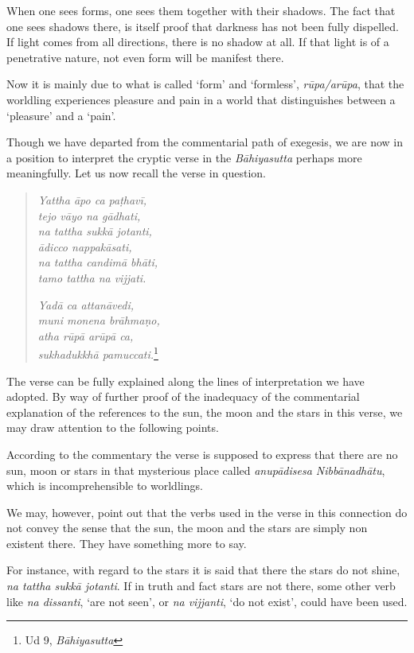 When one sees forms, one sees them together with their shadows. The fact that one sees shadows there, is itself proof that darkness has not been fully dispelled. If light comes from all directions, there is no shadow at all. If that light is of a penetrative nature, not even form will be manifest there.

Now it is mainly due to what is called `form' and `formless', \emph{rūpa/arūpa}, that the worldling experiences pleasure and pain in a world that distinguishes between a `pleasure' and a `pain'.

Though we have departed from the commentarial path of exegesis, we are now in a position to interpret the cryptic verse in the \emph{Bāhiyasutta} perhaps more meaningfully. Let us now recall the verse in question.

\begin{quote}
\emph{Yattha āpo ca paṭhavī,}\\
\emph{tejo vāyo na gādhati,}\\
\emph{na tattha sukkā jotanti,}\\
\emph{ādicco nappakāsati,}\\
\emph{na tattha candimā bhāti,}\\
\emph{tamo tattha na vijjati.}

\emph{Yadā ca attanāvedi,}\\
\emph{muni monena brāhmaṇo,}\\
\emph{atha rūpā arūpā ca,}\\
\emph{sukhadukkhā pamuccati.}\footnote{Ud 9, \emph{Bāhiyasutta}}
\end{quote}

The verse can be fully explained along the lines of interpretation we have adopted. By way of further proof of the inadequacy of the commentarial explanation of the references to the sun, the moon and the stars in this verse, we may draw attention to the following points.

According to the commentary the verse is supposed to express that there are no sun, moon or stars in that mysterious place called \emph{anupādisesa Nibbānadhātu}, which is incomprehensible to worldlings.

We may, however, point out that the verbs used in the verse in this connection do not convey the sense that the sun, the moon and the stars are simply non existent there. They have something more to say.

For instance, with regard to the stars it is said that there the stars do not shine, \emph{na tattha sukkā jotanti}. If in truth and fact stars are not there, some other verb like \emph{na dissanti}, `are not seen', or \emph{na vijjanti}, `do not exist', could have been used.

